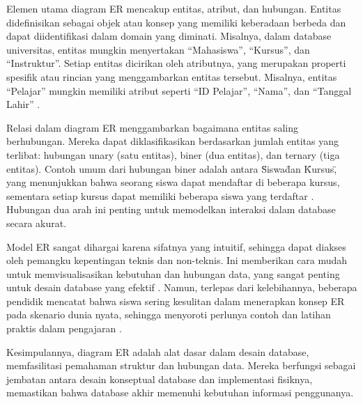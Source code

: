 Elemen utama diagram ER mencakup entitas, atribut, dan hubungan. Entitas didefinisikan sebagai objek atau konsep yang memiliki keberadaan berbeda dan dapat diidentifikasi dalam domain yang diminati. Misalnya, dalam database universitas, entitas mungkin menyertakan ``Mahasiswa'', ``Kursus'', dan ``Instruktur''. Setiap entitas dicirikan oleh atributnya, yang merupakan properti spesifik atau rincian yang menggambarkan entitas tersebut. Misalnya, entitas ``Pelajar'' mungkin memiliki atribut seperti ``ID Pelajar'', ``Nama'', dan ``Tanggal Lahir'' \citep{bagui2023database}.

Relasi dalam diagram ER menggambarkan bagaimana entitas saling berhubungan. Mereka dapat diklasifikasikan berdasarkan jumlah entitas yang terlibat: hubungan unary (satu entitas), biner (dua entitas), dan ternary (tiga entitas). Contoh umum dari hubungan biner adalah antara \"Siswa\" dan \"Kursus\", yang menunjukkan bahwa seorang siswa dapat mendaftar di beberapa kursus, sementara setiap kursus dapat memiliki beberapa siswa yang terdaftar \citep{bagui2023database}. Hubungan dua arah ini penting untuk memodelkan interaksi dalam database secara akurat.

Model ER sangat dihargai karena sifatnya yang intuitif, sehingga dapat diakses oleh pemangku kepentingan teknis dan non-teknis. Ini memberikan cara mudah untuk memvisualisasikan kebutuhan dan hubungan data, yang sangat penting untuk desain database yang efektif \citep{bagui2023database}. Namun, terlepas dari kelebihannya, beberapa pendidik mencatat bahwa siswa sering kesulitan dalam menerapkan konsep ER pada skenario dunia nyata, sehingga menyoroti perlunya contoh dan latihan praktis dalam pengajaran \citep{bagui2023database}.

Kesimpulannya, diagram ER adalah alat dasar dalam desain database, memfasilitasi pemahaman struktur dan hubungan data. Mereka berfungsi sebagai jembatan antara desain konseptual database dan implementasi fisiknya, memastikan bahwa database akhir memenuhi kebutuhan informasi penggunanya.

